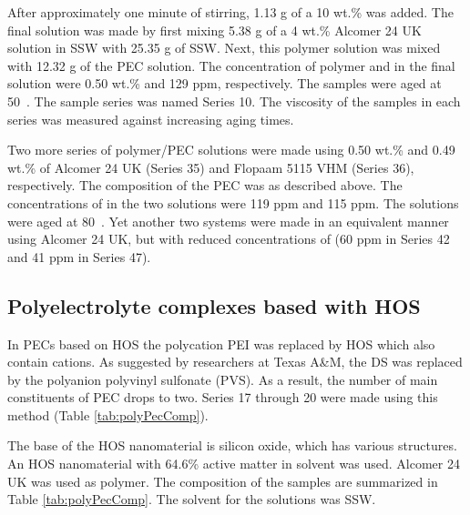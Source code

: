 \documentclass[nanomaterials,article,submit,moreauthors,pdftex]{Definitions/mdpi}
\begin{document}

 
After approximately one minute of stirring, 1.13 g of a 10 wt.\%  was added. The final solution was made by first mixing 5.38 g of a 4 wt.\% Alcomer 24 UK solution in SSW with 25.35 g of SSW. Next, this polymer solution was mixed with 12.32 g of the PEC solution. The concentration of polymer and  in the final solution were 0.50 wt.\% and 129 ppm, respectively. The samples were aged at 50~\celsius. The sample series was named Series 10. The viscosity of the samples in each series was measured against increasing aging times. 

Two more series of polymer/PEC solutions were made using 0.50 wt.\% and 0.49 wt.\% of Alcomer 24 UK (Series 35) and Flopaam 5115 VHM (Series 36), respectively. The composition of the PEC was as described above. The concentrations of  in the two solutions were 119 ppm and 115 ppm. The solutions were aged at 80~\celsius. Yet another two systems were made in an equivalent manner using Alcomer 24 UK, but with reduced concentrations of  (60 ppm in Series 42 and 41 ppm in Series 47).

\subsection{Polyelectrolyte complexes based with HOS}
In PECs based on HOS the polycation PEI was replaced by HOS which also contain cations. As suggested by researchers at Texas A\&M, the DS was replaced by the polyanion polyvinyl sulfonate (PVS). As a result, the number of main constituents of PEC drops to two. Series 17 through 20 were made using this method (Table \ref{tab:polyPecComp}). 


The base of the HOS nanomaterial is silicon oxide, which has various structures. An HOS nanomaterial with 64.6\% active matter in solvent was used. Alcomer 24 UK was used as polymer. The composition of the samples are summarized in Table \ref{tab:polyPecComp}. The solvent for the solutions was SSW.
\end{document}
